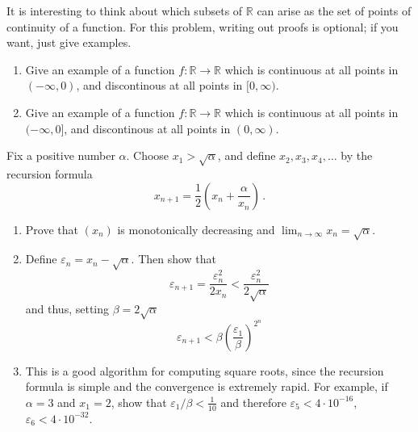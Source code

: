 \documentclass[12pt,letterpaper,reqno]{amsart}
\numberwithin{equation}{section}
\newcommand{\R}{\ensuremath{\mathbb R}}
\begin{document}
\begin{exercise}[6 points] It is interesting to think about which subsets of $\R$ can arise as the set of points of continuity of a function. For this problem, writing out proofs is optional; if you want, just give examples. 
\begin{enumerate}[label=(\alph*)] 
\item Give an example of a function $f:\R\to \R$ which is continuous at all points in $(-\infty, 0)$, and discontinous at all points in $[0,\infty)$.
\item Give an example of a function $f:\R\to \R$ which is continuous at all points in $(-\infty, 0]$, and discontinous at all points in $(0,\infty)$. 
\end{enumerate}
\end{exercise}

\noindent\hrulefill

\begin{exercise}
Fix a positive number $\alpha$. Choose $x_1 > \sqrt{\alpha}$, and define $x_2, x_3, x_4, \dots$
by the recursion formula
$$
x_{n+1} = \frac12 \left(x_n + \frac{\alpha}{x_n}\right) \, .
$$
\begin{enumerate}
    \item Prove that $(x_n)$ is monotonically decreasing and $\lim_{n \to \infty} x_n = \sqrt{\alpha}$.
    \item Define $\varepsilon_n = x_n - \sqrt{\alpha}$. Then show that
    $$
    \varepsilon_{n+1} = \frac{\varepsilon_n^2}{2 x_n} < \frac{\varepsilon_n^2}{2 \sqrt\alpha}
    $$
    and thus, setting $\beta = 2 \sqrt{\alpha}$
    $$
    \varepsilon_{n+1} < \beta \left(\frac{\varepsilon_1}{\beta}\right)^{2^n}
    $$
    \item This is a good algorithm for computing square roots, since the recursion formula is simple and the convergence is extremely rapid. For example, if $\alpha = 3$ and $x_1 = 2$,
    show that $\varepsilon_1 / \beta < \frac{1}{10}$ and therefore $\varepsilon_5 < 4 \cdot 10^{-16}$,
    $\varepsilon_6 < 4 \cdot 10^{-32}$.
\end{enumerate}

\end{exercise}
\end{document}
